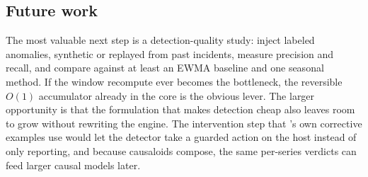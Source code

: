 \subsection{Future work}
The most valuable next step is a detection-quality study: inject labeled anomalies,
synthetic or replayed from past incidents, measure precision and recall, and compare
against at least an EWMA baseline and one seasonal method. If the window recompute
ever becomes the bottleneck, the reversible $O(1)$ accumulator already in the core is
the obvious lever. The larger opportunity is that the formulation that makes
detection cheap also leaves room to grow without rewriting the engine. The
intervention step that \dc{}'s own corrective examples use would let the detector
take a guarded action on the host instead of only reporting, and because causaloids
compose, the same per-series verdicts can feed larger causal models later.
